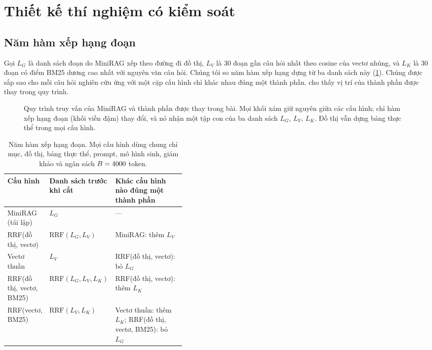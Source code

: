 \section{Thiết kế thí nghiệm có kiểm soát}\label{sec:design}

\subsection{Năm hàm xếp hạng đoạn}\label{sec:variants}
Gọi $L_G$ là danh sách đoạn do MiniRAG xếp theo đường đi đồ thị, $L_V$ là 30 đoạn gần câu hỏi nhất theo cosine của vectơ nhúng, và $L_K$ là 30 đoạn có điểm BM25 dương cao nhất với nguyên văn câu hỏi.
Chúng tôi so năm hàm xếp hạng dựng từ ba danh sách này (\cref{tab:variants}).
Chúng được sắp sao cho mỗi câu hỏi nghiên cứu ứng với một cặp cấu hình chỉ khác nhau đúng một thành phần.
 cho thấy vị trí của thành phần được thay trong quy trình.

\begin{figure}[t]\centering

\caption{Quy trình truy vấn của MiniRAG và thành phần được thay trong bài. Mọi khối xám giữ nguyên giữa các cấu hình; chỉ hàm xếp hạng đoạn (khối viền đậm) thay đổi, và nó nhận một tập con của ba danh sách $L_G$, $L_V$, $L_K$. Đồ thị vẫn dựng bảng thực thể trong mọi cấu hình.}
\label{fig:pipeline}
\end{figure}

\begin{table}[t]\centering
\caption{Năm hàm xếp hạng đoạn. Mọi cấu hình dùng chung chỉ mục, đồ thị, bảng thực thể, prompt, mô hình sinh, giám khảo và ngân sách $B=4000$ token.}
\label{tab:variants}
\small
\begin{tabular}{llp{0.42\linewidth}}
\toprule
Cấu hình & Danh sách trước khi cắt & Khác cấu hình nào đúng một thành phần \\
\midrule
MiniRAG (tái lập) & $L_G$ & --- \\
RRF(đồ thị, vectơ) & $\mathrm{RRF}(L_G, L_V)$ & MiniRAG: thêm $L_V$ \\
Vectơ thuần & $L_V$ & RRF(đồ thị, vectơ): bỏ $L_G$ \\
RRF(đồ thị, vectơ, BM25) & $\mathrm{RRF}(L_G, L_V, L_K)$ & RRF(đồ thị, vectơ): thêm $L_K$ \\
RRF(vectơ, BM25) & $\mathrm{RRF}(L_V, L_K)$ & Vectơ thuần: thêm $L_K$; RRF(đồ thị, vectơ, BM25): bỏ $L_G$ \\
\bottomrule
\end{tabular}
\end{table}

